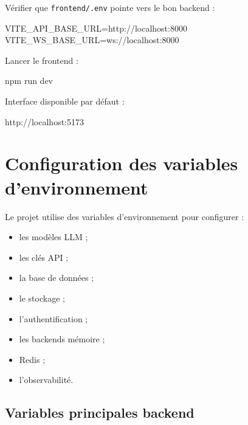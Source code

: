 \documentclass[
  french,
]{report}
\newenvironment{Shaded}{}{}
\newcommand{\ExtensionTok}[1]{#1}
\newcommand{\NormalTok}[1]{#1}
\providecommand{\tightlist}{%
  \setlength{\itemsep}{0pt}\setlength{\parskip}{0pt}}
\begin{document}
Vérifier que \texttt{frontend/.env} pointe vers le bon backend :

\begin{Shaded}
\begin{Highlighting}[]
\NormalTok{VITE\_API\_BASE\_URL=http://localhost:8000}
\NormalTok{VITE\_WS\_BASE\_URL=ws://localhost:8000}
\end{Highlighting}
\end{Shaded}

Lancer le frontend :

\begin{Shaded}
\begin{Highlighting}[]
\ExtensionTok{npm}\NormalTok{ run dev}
\end{Highlighting}
\end{Shaded}

Interface disponible par défaut :

\begin{Shaded}
\begin{Highlighting}[]
\NormalTok{http://localhost:5173}
\end{Highlighting}
\end{Shaded}

\chapter{Configuration des variables
d'environnement}\label{configuration-des-variables-denvironnement}

Le projet utilise des variables d'environnement pour configurer :

\begin{itemize}
\tightlist
\item
  les modèles LLM ;
\item
  les clés API ;
\item
  la base de données ;
\item
  le stockage ;
\item
  l'authentification ;
\item
  les backends mémoire ;
\item
  Redis ;
\item
  l'observabilité.
\end{itemize}

\section{Variables principales
backend}\label{variables-principales-backend}
\end{document}
